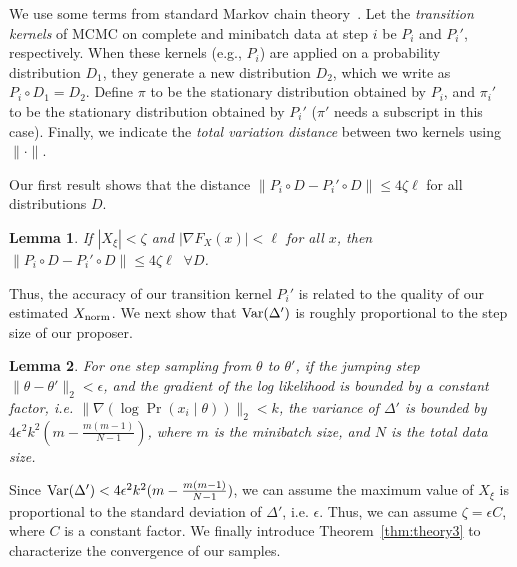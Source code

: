 \documentclass{article}
\newtheorem{lemma}{Lemma}
\begin{document}
We use some terms from standard Markov chain theory~\cite{Meyn2009}. Let the \emph{transition
kernels} of MCMC on complete and minibatch data at step $i$ be $P_i$ and $P_i'$, respectively. When
these kernels (e.g., $P_i$) are applied on a probability distribution $D_1$, they generate a new
distribution $D_2$, which we write as $P_i \circ D_1 = D_2$. Define $\pi$ to be the stationary
distribution obtained by $P_i$, and $\pi_i'$ to be the stationary distribution obtained by $P_i'$
($\pi'$ needs a subscript in this case).  Finally, we indicate the \emph{total variation distance}
between two kernels using $\| \cdot \|$.

Our first result shows that the distance $\|P_i\circ D - P_i'\circ D\| \le 4\zeta \ell$ for all
distributions $D$.


\begin{lemma}\label{lem:theory1}
If $|X_\xi| < \zeta$ and $|\nabla F_X(x)| < \ell$ for all $x$, then $\|P_i\circ D-P_i'\circ D\| \le
4\zeta \ell \;\;\forall D$.
\end{lemma}


Thus, the accuracy of our transition kernel $P_i'$ is related to the quality of our estimated
$X_{\rm norm}$. We next show that ${\rm Var}(\Delta')$ is roughly proportional to the step size of
our proposer.

\begin{lemma}\label{lem:theory2}
For one step sampling from $\theta$ to $\theta'$, if the jumping step $\|\theta - \theta'\|_2 <
\epsilon$, and the gradient of the log likelihood is bounded by a constant factor, i.e. $\|\nabla
(\log \Pr(x_i\mid \theta))\|_2 < k$, the variance of $\Delta'$ is bounded by $4\epsilon^2 k^2
(m-\frac{m(m-1)}{N-1})$, where $m$ is the minibatch size, and $N$ is the total data size.
\end{lemma}


Since ${\rm Var}(\Delta') < 4\epsilon^2 k^2 (m - \frac{m(m-1)}{N-1}) $, we can assume the maximum
value of $X_{\xi}$ is proportional to the standard deviation of $\Delta'$, i.e. $\epsilon$. Thus, we
can assume $\zeta=\epsilon C$, where $C$ is a constant factor. We finally introduce
Theorem~\ref{thm:theory3} to characterize the convergence of our samples.
\end{document}
